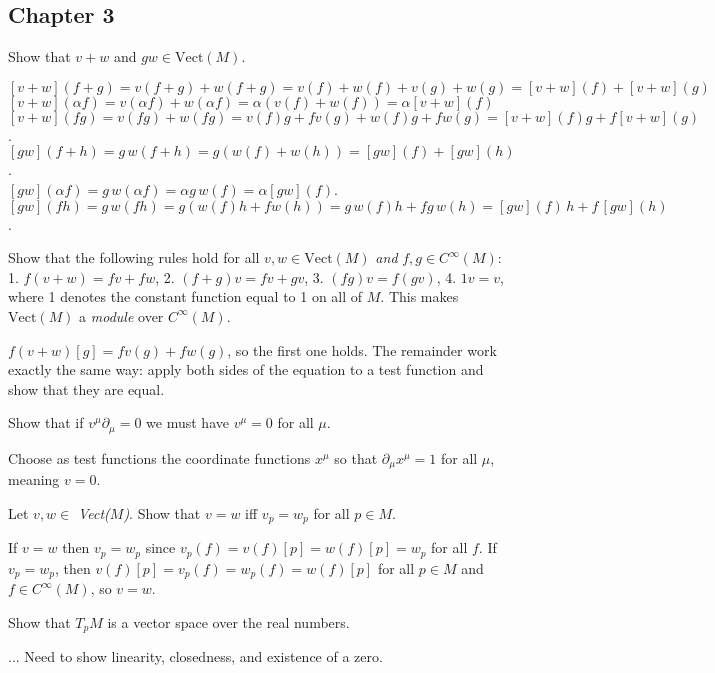 \subsection{Chapter 3}
\begin{p}
{Show that $v+w$ and $gw\in \text{Vect}(M)$.}
\end{p}

$[v+w](f+g)=v(f+g)+w(f+g)=v(f)+w(f)+v(g)+w(g)=[v+w](f)+[v+w](g)$\\
$[v+w](\alpha f)=v(\alpha f)+w(\alpha f)=\alpha (v(f)+w(f))=\alpha[v+w](f)$\\
$[v+w](fg)=v(fg)+w(fg)=v(f)g+f v(g)+w(f)g+f w(g)=[v+w](f)g+f[v+w](g)$.\\

$[gw](f+h)=g\, w(f+h)=g(w(f)+w(h))=[gw](f)+[gw](h)$.\\
$[gw](\alpha f)=g\, w(\alpha f)=\alpha g\, w(f)=\alpha[gw](f)$.\\
$[gw](fh)=g\,w(fh)=g(w(f)h+fw(h))=g\,w(f)h+fg\,w(h)=[gw](f)\,h+f\,[gw](h)$.


\begin{p} Show that the following rules hold for all $v, w\in \text{Vect}(M)$ {\em and}
$f,g\in C^\infty(M)$: 1. $f(v+w)=fv+fw$, 2. $(f+g)v=fv+gv$, 3. $(fg)v=f(gv)$, 4. $1v=v$, where 1 denotes the constant function equal to 1 on all of $M$. This makes $\text{Vect}(M)$ 
a \emph{module} over $C^\infty(M)$.
\end{p}
$f(v+w)[g]=fv(g)+fw(g)$, so the first one holds. The remainder work exactly the same way:
apply both sides of the equation to a test function and show that they are equal.

\begin{p}
{Show that if $v^\mu\partial_\mu=0$ we must have $v^\mu=0$ for all $\mu$.}
\end{p}
Choose as test functions the coordinate functions $x^\mu$ so that $\partial_\mu x^\mu = 1$ for all
$\mu$, meaning $v=0$.

\begin{p}
{Let $v,w\in$ \emph{Vect($M$)}. Show that $v=w$ iff $v_p=w_p$ for all $p\in M$.}
\end{p}
If $v=w$ then $v_p=w_p$ since $v_p(f)=v(f)[p]=w(f)[p]=w_p$ for all $f$. If $v_p=w_p$, 
then $v(f)[p]=v_p(f)=w_p(f)=w(f)[p]$ for all $p\in M$ and $f\in C^\infty(M)$, so $v=w$.


\begin{p}
{Show that $T_p M$ is a vector space over the real numbers.}
\end{p}
... Need to show linearity, closedness, and existence of a zero.

